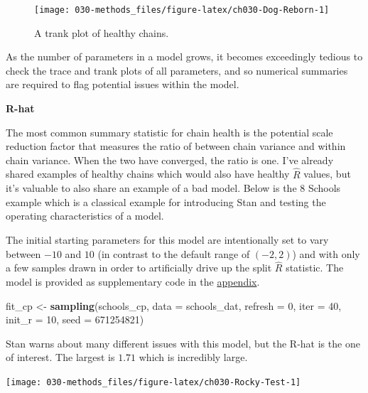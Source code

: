\documentclass[11pt, oneside, openany]{scrbook}
\newenvironment{Shaded}{\begin{snugshade}}{\end{snugshade}}
\newcommand{\DataTypeTok}[1]{\textcolor[rgb]{0.13,0.29,0.53}{#1}}
\newcommand{\DecValTok}[1]{\textcolor[rgb]{0.00,0.00,0.81}{#1}}
\newcommand{\KeywordTok}[1]{\textcolor[rgb]{0.13,0.29,0.53}{\textbf{#1}}}
\newcommand{\NormalTok}[1]{#1}
\newcommand{\StringTok}[1]{\textcolor[rgb]{0.31,0.60,0.02}{#1}}
\begin{document}
\begin{figure}

{\centering \texttt{[image: 030-methods\_files/figure-latex/ch030-Dog-Reborn-1]} 

}

\caption{A trank plot of healthy chains.}\label{fig:ch030-Dog-Reborn}
\end{figure}

As the number of parameters in a model grows, it becomes exceedingly tedious to check the trace and trank plots of all parameters, and so numerical summaries are required to flag potential issues within the model.

\textbf{R-hat}

The most common summary statistic for chain health is the potential scale reduction factor \citep{gelman1992inference} that measures the ratio of between chain variance and within chain variance. When the two have converged, the ratio is one. I've already shared examples of healthy chains which would also have healthy \(\hat{R}\) values, but it's valuable to also share an example of a bad model. Below is the 8 Schools example \citep{gelman2013bayesian} which is a classical example for introducing Stan and testing the operating characteristics of a model.

The initial starting parameters for this model are intentionally set to vary between \(-10\) and \(10\) (in contrast to the default range of \((-2, 2)\)) and with only a few samples drawn in order to artificially drive up the split \(\hat{R}\) statistic. The model is provided as supplementary code in the \protect\hyperlink{code}{appendix}.

\begin{Shaded}
\begin{Highlighting}[]
\NormalTok{fit_cp <-}\StringTok{ }\KeywordTok{sampling}\NormalTok{(schools_cp, }\DataTypeTok{data =}\NormalTok{ schools_dat, }\DataTypeTok{refresh =} \DecValTok{0}\NormalTok{,}
                   \DataTypeTok{iter =} \DecValTok{40}\NormalTok{, }\DataTypeTok{init_r =} \DecValTok{10}\NormalTok{, }\DataTypeTok{seed =} \DecValTok{671254821}\NormalTok{)}
\end{Highlighting}
\end{Shaded}

Stan warns about many different issues with this model, but the R-hat is the one of interest. The largest is \(1.71\) which is incredibly large.

\begin{center}\texttt{[image: 030-methods\_files/figure-latex/ch030-Rocky-Test-1]} \end{center}
\end{document}
